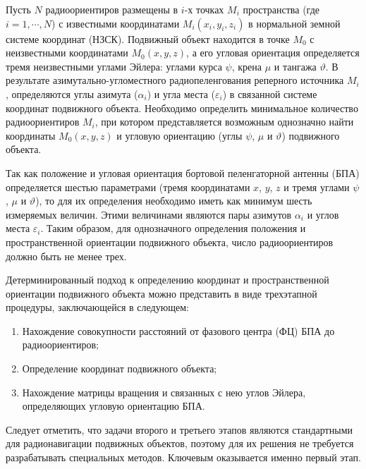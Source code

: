 \documentclass[../main.tex]{subfiles}
\begin{document}
Пусть $N$ радиоориентиров размещены в $i$-х точках $M_i$ пространства (где $i = 1, \cdots, N$) с известными
координатами $M_i\left(x_i, y_i, z_i\right)$ в нормальной земной системе координат (НЗСК). Подвижный объект
находится в точке $M_0$ с неизвестными координатами $M_0\left(x, y, z\right)$, а его угловая ориентация
определяется тремя неизвестными углами Эйлера: углами курса $\psi$, крена $\mu$ и тангажа $\vartheta$.
В результате азимутально-угломестного радиопеленгования реперного источника $M_i$, определяются углы
азимута ($\alpha_i$) и угла места ($\varepsilon_i$) в связанной системе координат подвижного объекта. Необходимо
определить минимальное количество радиоориентиров $M_i$, при котором представляется возможным однозначно найти
координаты $M_0\left(x, y, z\right)$ и угловую ориентацию (углы $\psi$, $\mu$ и $\vartheta$) подвижного
объекта.

Так как положение и угловая ориентация бортовой пеленгаторной антенны (БПА) определяется шестью параметрами
(тремя координатами $x$, $y$, $z$ и тремя углами $\psi$, $\mu$ и $\vartheta$), то для их определения необходимо
иметь как минимум шесть измеряемых величин. Этими величинами являются пары азимутов $\alpha_i$ и углов места
$\varepsilon_i$. Таким образом, для однозначного определения положения и пространственной ориентации подвижного
объекта, число радиоориентиров должно быть не менее трех.

Детерминированный подход к определению координат и пространственной ориентации подвижного объекта можно представить
в виде трехэтапной процедуры, заключающейся в следующем:
\begin{enumerate}
    \item Нахождение совокупности расстояний от фазового центра (ФЦ) БПА до радиоориентиров;
    \item Определение координат подвижного объекта;
    \item Нахождение матрицы вращения и связанных с нею углов Эйлера, определяющих угловую ориентацию БПА.
\end{enumerate}

Следует отметить, что задачи второго и третьего этапов являются стандартными для радионавигации подвижных объектов, поэтому для их решения не требуется разрабатывать специальных методов. Ключевым оказывается именно первый этап.
\end{document}
